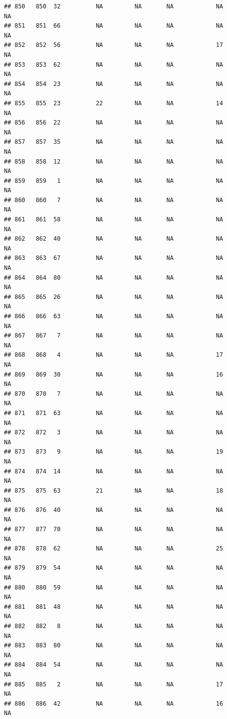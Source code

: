 \documentclass[man]{apa6}
\begin{document}
\begin{verbatim}
## 850   850  32          NA         NA       NA            NA       NA
## 851   851  66          NA         NA       NA            NA       NA
## 852   852  56          NA         NA       NA            17       NA
## 853   853  62          NA         NA       NA            NA       NA
## 854   854  23          NA         NA       NA            NA       NA
## 855   855  23          22         NA       NA            14       NA
## 856   856  22          NA         NA       NA            NA       NA
## 857   857  35          NA         NA       NA            NA       NA
## 858   858  12          NA         NA       NA            NA       NA
## 859   859   1          NA         NA       NA            NA       NA
## 860   860   7          NA         NA       NA            NA       NA
## 861   861  58          NA         NA       NA            NA       NA
## 862   862  40          NA         NA       NA            NA       NA
## 863   863  67          NA         NA       NA            NA       NA
## 864   864  80          NA         NA       NA            NA       NA
## 865   865  26          NA         NA       NA            NA       NA
## 866   866  63          NA         NA       NA            NA       NA
## 867   867   7          NA         NA       NA            NA       NA
## 868   868   4          NA         NA       NA            17       NA
## 869   869  30          NA         NA       NA            16       NA
## 870   870   7          NA         NA       NA            NA       NA
## 871   871  63          NA         NA       NA            NA       NA
## 872   872   3          NA         NA       NA            NA       NA
## 873   873   9          NA         NA       NA            19       NA
## 874   874  14          NA         NA       NA            NA       NA
## 875   875  63          21         NA       NA            18       NA
## 876   876  40          NA         NA       NA            NA       NA
## 877   877  70          NA         NA       NA            NA       NA
## 878   878  62          NA         NA       NA            25       NA
## 879   879  54          NA         NA       NA            NA       NA
## 880   880  59          NA         NA       NA            NA       NA
## 881   881  48          NA         NA       NA            NA       NA
## 882   882   8          NA         NA       NA            NA       NA
## 883   883  80          NA         NA       NA            NA       NA
## 884   884  54          NA         NA       NA            NA       NA
## 885   885   2          NA         NA       NA            17       NA
## 886   886  42          NA         NA       NA            16       NA

\end{verbatim}
\end{document}
